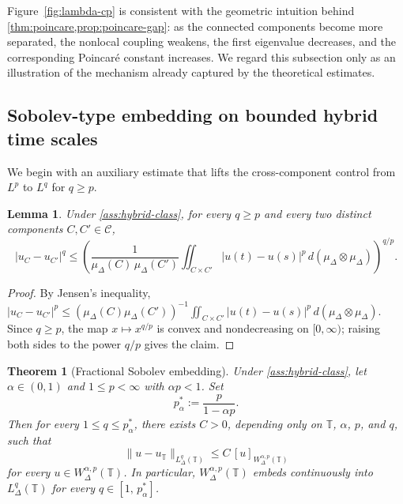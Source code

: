 \documentclass[11pt,a4paper]{article}
\numberwithin{equation}{section}
\newtheorem{theorem}{Theorem}[section]
\newtheorem{lemma}[lemma]{Lemma}
\theoremstyle{definition}
\newcommand{\T}{\mathbb{T}}
\begin{document}
Figure~\ref{fig:lambda-cp} is consistent with the geometric intuition behind \cref{thm:poincare,prop:poincare-gap}: as the connected components become more separated, the nonlocal coupling weakens, the first eigenvalue decreases, and the corresponding Poincar\'e constant increases. We regard this subsection only as an illustration of the mechanism already captured by the theoretical estimates.

\subsection{Sobolev-type embedding on bounded hybrid time scales}
\label{subsec:sobolev}

We begin with an auxiliary estimate that lifts the cross-component control
from $L^p$ to $L^q$ for $q\ge p$.

\begin{lemma}\label{lem:cross-Lq}
Under \cref{ass:hybrid-class}, for every $q\ge p$ and every two distinct
components $C,C'\in\mathcal C$,
\[
|u_C - u_{C'}|^q
\le
\left(\frac{1}{\mu_\Delta(C)\,\mu_\Delta(C')}
\iint_{C\times C'}|u(t)-u(s)|^p\,
d(\mu_\Delta\otimes\mu_\Delta)\right)^{q/p}.
\]
\end{lemma}

\begin{proof}
By Jensen's inequality,
$|u_C-u_{C'}|^p \le
(\mu_\Delta(C)\mu_\Delta(C'))^{-1}
\iint_{C\times C'}|u(t)-u(s)|^p\,d(\mu_\Delta\otimes\mu_\Delta)$.
Since $q\ge p$, the map $x\mapsto x^{q/p}$ is convex and nondecreasing on
$[0,\infty)$; raising both sides to the power $q/p$ gives the claim.
\end{proof}

\begin{theorem}[Fractional Sobolev embedding]\label{thm:embedding}
Under \cref{ass:hybrid-class}, let $\alpha\in(0,1)$ and $1\le p<\infty$
with $\alpha p < 1$. Set
\[
p^*_\alpha := \frac{p}{1-\alpha p}.
\]
Then for every $1\le q \le p^*_\alpha$, there exists $C>0$, depending only
on $\T$, $\alpha$, $p$, and $q$, such that
\begin{equation}\label{eq:sobolev-embedding}
\|u - u_\T\|_{L^q_\Delta(\T)}
\le C\,[u]_{W^{\alpha,p}_\Delta(\T)}
\end{equation}
for every $u\in W^{\alpha,p}_\Delta(\T)$. In particular,
$W^{\alpha,p}_\Delta(\T)$ embeds continuously into $L^q_\Delta(\T)$ for
every $q\in[1,\,p^*_\alpha]$.
\end{theorem}
\end{document}
